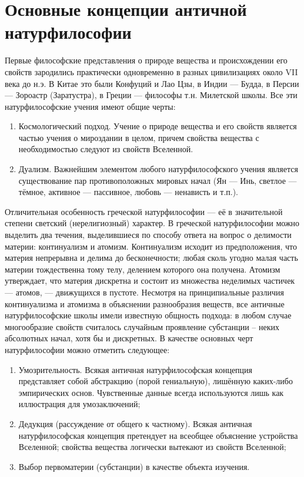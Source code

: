 \documentclass[12pt]{article}
\begin{document}
\section{Основные концепции античной натурфилософии}
Первые философские представления о природе вещества и происхождении его свойств зародились практически
одновременно в разных цивилизациях около VII века до н.э. В Китае это были Конфуций и Лао Цзы, в Индии ---
Будда, в Персии --- Зороастр (Заратустра), в Греции --- философы т.н. Милетской школы.
Все эти натурфилософские учения имеют общие черты:
\begin{enumerate}
  \item Космологический подход. Учение о природе вещества и его свойств является частью учения
    о мироздании в целом, причем свойства вещества с необходимостью следуют из свойств Вселенной.
\item Дуализм. Важнейшим  элементом  любого  натурфилософского  учения  является  существование  пар
противоположных мировых начал (Ян --- Инь, светлое --- тёмное, активное --- пассивное,
любовь --- ненависть и т.п.).
\end{enumerate}
Отличительная особенность греческой натурфилософии --- её в значительной степени светский (нерелигиозный)
характер. В греческой натурфилософии можно выделить два течения, выделившиеся по способу ответа на
вопрос о делимости материи: континуализм и атомизм.
Континуализм исходит из предположения, что материя непрерывна и делима до бесконечности; любая сколь
угодно малая часть материи тождественна тому телу, делением которого она получена.
Атомизм  утверждает, что материя дискретна и состоит из множества неделимых частичек --- атомов, ---
движущихся в пустоте.
Несмотря на принципиальные различия континуализма и атомизма в объяснении разнообразия веществ,  все
античные  натурфилософские  школы  имели  известную  общность  подхода:  в  любом  случае  многообразие
свойств считалось случайным проявление субстанции – неких абсолютных начал, хотя бы и дискретных.
В качестве основных черт натурфилософии можно отметить следующее:
\begin{enumerate}
  \item Умозрительность. Всякая античная натурфилософская концепция представляет собой абстракцию (порой
гениальную), лишённую каких-либо эмпирических основ. Чувственные данные всегда используются лишь как
иллюстрация для умозаключений;
\item Дедукция (рассуждение от общего к частному). Всякая античная натурфилософская концепция
  претендует на
всеобщее объяснение устройства Вселенной; свойства вещества логически вытекают из свойств Вселенной;
\item Выбор первоматерии (субстанции) в качестве объекта изучения.
\end{enumerate}
\end{document}
